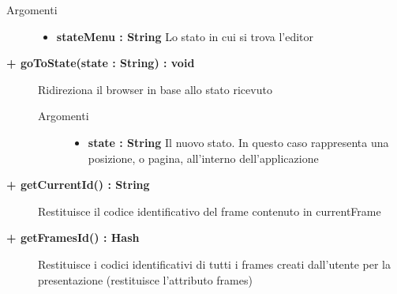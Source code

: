 \begin{description}
\begin{description}
		\begin{description}
			\item[Argomenti] \hfill
				\begin{itemize}
				
					\item \textbf{stateMenu : String		} \hfill
					Lo stato in cui si trova l'editor
					
				\end{itemize}
				
		\end{description}
	\end{description}
	
	\begin{description}
		\item[\textbf{\color{blue}+ goToState(state : String) : void  	}] \hfill
			Ridireziona il browser in base allo stato ricevuto
			
		\begin{description}
			\item[Argomenti] \hfill
				\begin{itemize}
				
					\item \textbf{state : String		} \hfill
					Il nuovo stato. In questo caso rappresenta una posizione, o pagina, all'interno dell'applicazione					
				\end{itemize}
				
		\end{description}
	\end{description}
	
	
	\begin{description}
		\item[\textbf{\color{blue}+ getCurrentId() : String	}] \hfill
			Restituisce il codice identificativo del frame contenuto in currentFrame
		
	\end{description}
	
	
	\begin{description}
		\item[\textbf{\color{blue}+ getFramesId() : Hash	}] \hfill
			Restituisce i codici identificativi di tutti i frames creati dall'utente per la presentazione (restituisce l'attributo frames)
		
	\end{description}
	

\end{description}
